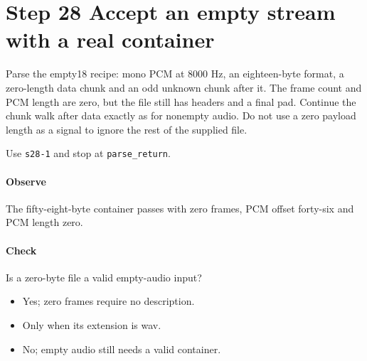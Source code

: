 \section{Step 28 Accept an empty stream with a real container}\label{pcm-wav-s28}
Parse the empty18 recipe: mono PCM at 8000 Hz, an eighteen-byte format, a zero-length data chunk and an odd unknown chunk after it. The frame count and PCM length are zero, but the file still has headers and a final pad. Continue the chunk walk after data exactly as for nonempty audio. Do not use a zero payload length as a signal to ignore the rest of the supplied file.

Use \texttt{s28-1} and stop at \texttt{parse\_return}.

\paragraph{Observe} The fifty-eight-byte container passes with zero frames, PCM offset forty-six and PCM length zero.

\paragraph{Check} Is a zero-byte file a valid empty-audio input?
\begin{itemize}
\item[A.] Yes; zero frames require no description.
\item[B.] Only when its extension is wav.
\item[C.] No; empty audio still needs a valid container.
\end{itemize}
